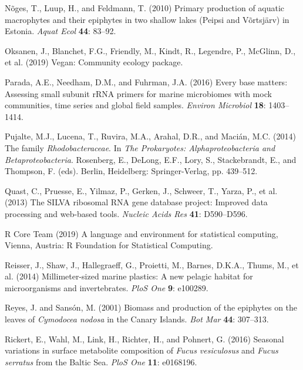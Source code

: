 \documentclass[12pt,]{article}
\begin{document}
\leavevmode\hypertarget{ref-Noges2010}{}%
Nõges, T., Luup, H., and Feldmann, T. (2010) Primary production of
aquatic macrophytes and their epiphytes in two shallow lakes (Peipsi and
Võrtsjärv) in Estonia. \emph{Aquat Ecol} \textbf{44}: 83--92.

\leavevmode\hypertarget{ref-Oksanen2019}{}%
Oksanen, J., Blanchet, F.G., Friendly, M., Kindt, R., Legendre, P.,
McGlinn, D., et al. (2019) Vegan: Community ecology package.

\leavevmode\hypertarget{ref-Parada2016}{}%
Parada, A.E., Needham, D.M., and Fuhrman, J.A. (2016) Every base
matters: Assessing small subunit rRNA primers for marine microbiomes
with mock communities, time series and global field samples.
\emph{Environ Microbiol} \textbf{18}: 1403--1414.

\leavevmode\hypertarget{ref-Pujalte2014}{}%
Pujalte, M.J., Lucena, T., Ruvira, M.A., Arahal, D.R., and Macián, M.C.
(2014) The family \emph{Rhodobacteraceae}. In \emph{The Prokaryotes:
Alphaproteobacteria and Betaproteobacteria}. Rosenberg, E., DeLong,
E.F., Lory, S., Stackebrandt, E., and Thompson, F. (eds). Berlin,
Heidelberg: Springer-Verlag, pp. 439--512.

\leavevmode\hypertarget{ref-Quast2013}{}%
Quast, C., Pruesse, E., Yilmaz, P., Gerken, J., Schweer, T., Yarza, P.,
et al. (2013) The SILVA ribosomal RNA gene database project: Improved
data processing and web-based tools. \emph{Nucleic Acids Res}
\textbf{41}: D590--D596.

\leavevmode\hypertarget{ref-RCoreTeam2019}{}%
R Core Team (2019) A language and environment for statistical computing,
Vienna, Austria: R Foundation for Statistical Computing.

\leavevmode\hypertarget{ref-Reisser2014}{}%
Reisser, J., Shaw, J., Hallegraeff, G., Proietti, M., Barnes, D.K.A.,
Thums, M., et al. (2014) Millimeter-sized marine plastics: A new pelagic
habitat for microorganisms and invertebrates. \emph{PloS One}
\textbf{9}: e100289.

\leavevmode\hypertarget{ref-Reyes2001}{}%
Reyes, J. and Sansón, M. (2001) Biomass and production of the epiphytes
on the leaves of \emph{Cymodocea nodosa} in the Canary Islands.
\emph{Bot Mar} \textbf{44}: 307--313.

\leavevmode\hypertarget{ref-Rickert2016}{}%
Rickert, E., Wahl, M., Link, H., Richter, H., and Pohnert, G. (2016)
Seasonal variations in surface metabolite composition of \emph{Fucus
vesiculosus} and \emph{Fucus serratus} from the Baltic Sea. \emph{PloS
One} \textbf{11}: e0168196.
\end{document}
